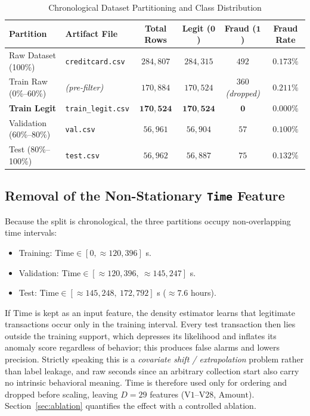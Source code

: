 \documentclass[11pt, a4paper]{article}
\begin{document}
\begin{table}[h!]
\centering
\caption{Chronological Dataset Partitioning and Class Distribution}
\vspace{0.2cm}
\renewcommand{\arraystretch}{1.25}
\small
\setlength{\tabcolsep}{4pt}
\begin{tabular}{llcccc}
\toprule
\rowcolor{tableheader}
\textbf{Partition} & \textbf{Artifact File} & \textbf{Total Rows} & \textbf{Legit ($\mathbf{0}$)} & \textbf{Fraud ($\mathbf{1}$)} & \textbf{Fraud Rate} \\
\midrule
Raw Dataset (100\%) & \texttt{creditcard.csv} & $284{,}807$ & $284{,}315$ & $492$ & $0.173\%$ \\
\rowcolor{rowalt}
Train Raw (0\%--60\%) & \textit{(pre-filter)} & $170{,}884$ & $170{,}524$ & $360$ \textit{(dropped)} & $0.211\%$ \\
\textbf{Train Legit} & \texttt{train\_legit.csv} & $\mathbf{170{,}524}$ & $\mathbf{170{,}524}$ & $\mathbf{0}$ & $\mathbf{0.000\%}$ \\
\rowcolor{rowalt}
Validation (60\%--80\%) & \texttt{val.csv} & $56{,}961$ & $56{,}904$ & $57$ & $0.100\%$ \\
Test (80\%--100\%) & \texttt{test.csv} & $56{,}962$ & $56{,}887$ & $75$ & $0.132\%$ \\
\bottomrule
\end{tabular}
\label{tab:splits}
\end{table}

\subsection{Removal of the Non-Stationary \texttt{Time} Feature}
\label{sec:time}
Because the split is chronological, the three partitions occupy non-overlapping time intervals:
\begin{itemize}
    \item Training: $\text{Time} \in [0, \approx 120{,}396]$ s.
    \item Validation: $\text{Time} \in [\approx 120{,}396,\ \approx 145{,}247]$ s.
    \item Test: $\text{Time} \in [\approx 145{,}248,\ 172{,}792]$ s ($\approx 7.6$ hours).
\end{itemize}
If $\text{Time}$ is kept as an input feature, the density estimator learns that legitimate transactions occur only in the training interval. Every test transaction then lies outside the training support, which depresses its likelihood and inflates its anomaly score regardless of behavior; this produces false alarms and lowers precision. Strictly speaking this is a \emph{covariate shift / extrapolation} problem rather than label leakage, and raw seconds since an arbitrary collection start also carry no intrinsic behavioral meaning. $\text{Time}$ is therefore used only for ordering and dropped before scaling, leaving $D = 29$ features ($\text{V1}$--$\text{V28}$, $\text{Amount}$). Section~\ref{sec:ablation} quantifies the effect with a controlled ablation.
\end{document}
